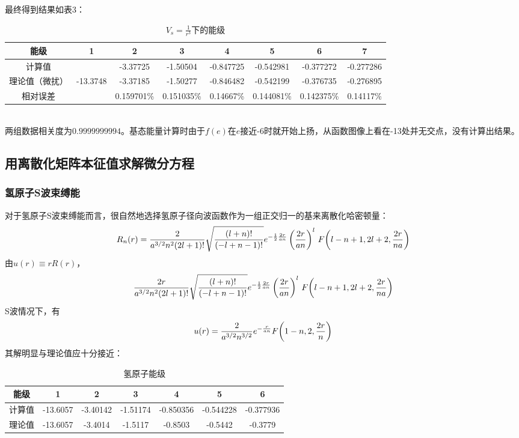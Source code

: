 \documentclass[hyperref,cs4size,titlepage,twoside]{ctexart}
\begin{document}
最终得到结果如表3：
\begin{table}[!htbp]
  \centering
  \begin{tabular}{|c|c|c|c|c|c|c|c|}
    \hline
    能级 & 1 & 2 & 3 & 4 & 5 & 6 & 7 \\
    \hline
    计算值 &  & -3.37725 & -1.50504 & -0.847725 & -0.542981 & -0.377272 & -0.277286  \\
    \hline
    理论值（微扰）& -13.3748 & -3.37185 & -1.50277 & -0.846482 & -0.542199 & -0.376735 & -0.276895 \\
    \hline
    相对误差 &  & 0.159701\% & 0.151035\% & 0.14667\% & 0.144081\% & 0.142375\% & 0.14117\% \\
    \hline
  \end{tabular}
  \caption{$\displaystyle V_s=\frac{1}{r^3}$下的能级}
\end{table}\\
两组数据相关度为$0.9999999994$。基态能量计算时由于$f(e)$在$e$接近-6时就开始上扬，从函数图像上看在-13处并无交点，没有计算出结果。

\subsection{用离散化矩阵本征值求解微分方程}
\subsubsection{氢原子S波束缚能}
对于氢原子S波束缚能而言，很自然地选择氢原子径向波函数作为一组正交归一的基来离散化哈密顿量：
\begin{equation}
R_n(r)=\frac{2}{a^{3/2} n^2 (2 l+1)!} \sqrt{\frac{(l+n)!}{(-l+n-1)!}} e^{-\frac{1}{2}\frac{2 r}{a n}} \left(\frac{2 r}{a n}\right)^l \,F\pqty{l-n+1,2 l+2,\frac{2 r}{n a}}
\end{equation}
由$u(r)\equiv rR(r)$，
\begin{equation}\label{ur}
  \frac{2r}{a^{3/2} n^2 (2 l+1)!} \sqrt{\frac{(l+n)!}{(-l+n-1)!}} e^{-\frac{1}{2}\frac{2 r}{a n}} \left(\frac{2 r}{a n}\right)^l \,F\pqty{l-n+1,2 l+2,\frac{2 r}{n a}}
\end{equation}
S波情况下，有
\begin{equation}\label{us}
  u(r)=\frac{2 }{a^{3/2} n^{3/2}}e^{-\frac{r}{a n}}F\pqty{1-n,2,\frac{2 r}{n}}
\end{equation}
其解明显与理论值应十分接近：
\begin{table}[!htdp]
  \centering
  \begin{tabular}{|c|c|c|c|c|c|c|}
    \hline
    能级 & 1 & 2 & 3 & 4 & 5 & 6 \\
    \hline
    计算值 & -13.6057 & -3.40142 & -1.51174 & -0.850356 & -0.544228 & -0.377936\\
    \hline
    理论值 & -13.6057 & -3.4014 & -1.5117 & -0.8503 & -0.5442 & -0.3779 \\
    \hline
  \end{tabular}
  \caption{氢原子能级}
\end{table}
\end{document}
